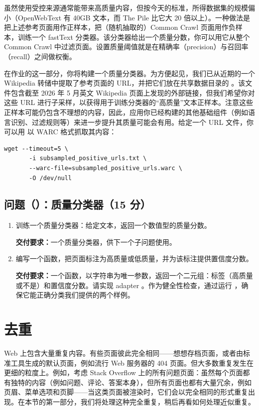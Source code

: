 虽然使用受控来源通常能带来高质量内容，但按今天的标准，所得数据集的规模偏小（OpenWebText 有 40GB 文本，而 The Pile 比它大 20 倍以上）。一种做法是把上述参考页面用作正样本，把（随机抽取的）Common Crawl 页面用作负样本，训练一个 fastText 分类器。该分类器给出一个质量分数，你可以用它从整个 Common Crawl 中过滤页面。设置质量阈值就是在精确率（precision）与召回率（recall）之间做权衡。

在作业的这一部分，你将构建一个质量分类器。为方便起见，我们已从近期的一个 Wikipedia 转储中提取了参考页面的 URL，并把它们放在共享数据目录的 。该文件包含截至 2026 年 5 月英文 Wikipedia 页面上发现的外部链接，但我们希望你对这些 URL 进行子采样，以获得用于训练分类器的“高质量”文本正样本。注意这些正样本可能仍包含不理想的内容，因此，应用你已经构建的其他基础组件（例如语言识别、过滤规则等）来进一步提升其质量可能会有用。给定一个 URL 文件，你可以用  以 WARC 格式抓取其内容：

\begin{lstlisting}
wget --timeout=5 \
       -i subsampled_positive_urls.txt \
       --warc-file=subsampled_positive_urls.warc \
       -O /dev/null
\end{lstlisting}

\subsection*{问题（）：质量分类器（15 分）}

\begin{enumerate}[label=(\alph*)]
  \item 训练一个质量分类器：给定文本，返回一个数值型的质量分数。

  \textbf{交付要求：}一个质量分类器，供下一个子问题使用。

  \item 编写一个函数，把页面标注为高质量或低质量，并为该标注提供置信度分数。

  \textbf{交付要求：}一个函数，以字符串为唯一参数，返回一个二元组：标签（高质量或不是）和置信度分数。请实现 adapter 。作为健全性检查，通过运行 ，确保它能正确分类我们提供的两个样例。
\end{enumerate}

\section{去重}

Web 上包含大量重复内容。有些页面彼此完全相同——想想存档页面，或者由标准工具生成的默认页面，例如流行 Web 服务器的 404 页面。但大多数重复发生在更细的粒度上。例如，考虑 Stack Overflow 上的所有问题页面：虽然每个页面都有独特的内容（例如问题、评论、答案本身），但所有页面也都有大量冗余，例如页眉、菜单选项和页脚——当这类页面被渲染时，它们会以完全相同的形式重复出现。在本节的第一部分，我们将处理这种完全重复，稍后再看如何处理近似重复。

